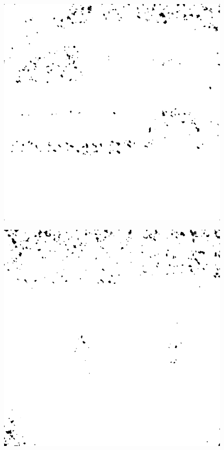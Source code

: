 \begin{figure}[H]
\vspace*{-1.2cm}
\begin{minipage}[t]{0.3\linewidth} %
	\includegraphics[width = 1\linewidth]{gfx/car/car_m15.png}
	\label{fig:car_m15}
\end{minipage}
\begin{minipage}[t]{0.3\linewidth} %
	\includegraphics[width = 1\linewidth]{gfx/hus/hus_m15.png}

\end{minipage}
\end{figure}
